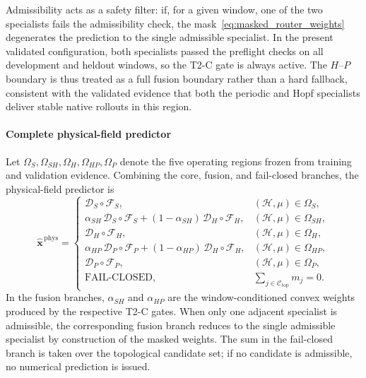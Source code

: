 Admissibility acts as a safety filter: if, for a given window, one of the
two specialists fails the admissibility check, the mask~\eqref{eq:masked_router_weights}
degenerates the prediction to the single admissible specialist.  In the
present validated configuration, both specialists passed the preflight
checks on all development and heldout windows, so the T2-C gate is always
active.  The $H$--$P$ boundary is thus treated as a full fusion boundary
rather than a hard fallback, consistent with the validated evidence that
both the periodic and Hopf specialists deliver stable native rollouts in
this region.

\paragraph{Complete physical-field predictor}
Let
$\Omega_S,\Omega_{SH},\Omega_H,\Omega_{HP},\Omega_P$
denote the five operating regions frozen from training and validation
evidence.  Combining the core, fusion, and fail-closed branches, the
physical-field predictor is
\begin{equation}
  \widehat{\boldsymbol{x}}^{\,\mathrm{phys}}
  =
  \begin{cases}
  \mathcal{D}_{S}\!\circ\mathcal{F}_{S},
  &(\mathcal{H},\mu)\in\Omega_S,\\[1mm]
  \alpha_{SH}\,\mathcal{D}_{S}\!\circ\mathcal{F}_{S}
  +(1-\alpha_{SH})\,\mathcal{D}_{H}\!\circ\mathcal{F}_{H},
  &(\mathcal{H},\mu)\in\Omega_{SH},\\[1mm]
  \mathcal{D}_{H}\!\circ\mathcal{F}_{H},
  &(\mathcal{H},\mu)\in\Omega_H,\\[1mm]
  \alpha_{HP}\,\mathcal{D}_{P}\!\circ\mathcal{F}_{P}
  +(1-\alpha_{HP})\,\mathcal{D}_{H}\!\circ\mathcal{F}_{H},
  &(\mathcal{H},\mu)\in\Omega_{HP},\\[1mm]
  \mathcal{D}_{P}\!\circ\mathcal{F}_{P},
  &(\mathcal{H},\mu)\in\Omega_P,\\[1mm]
  \mathrm{FAIL\mbox{-}CLOSED},
  &\sum_{j\in\mathcal{C}_{\mathrm{top}}}m_j=0.
  \end{cases}
  \label{eq:complete_ral_moe_predictor}
\end{equation}
In the fusion branches, $\alpha_{SH}$ and $\alpha_{HP}$ are the
window-conditioned convex weights produced by the respective T2-C gates.
When only one adjacent specialist is admissible, the corresponding fusion
branch reduces to the single admissible specialist by construction of the
masked weights.  The sum in the fail-closed branch is taken over the
topological candidate set; if no candidate is admissible, no numerical
prediction is issued.


















